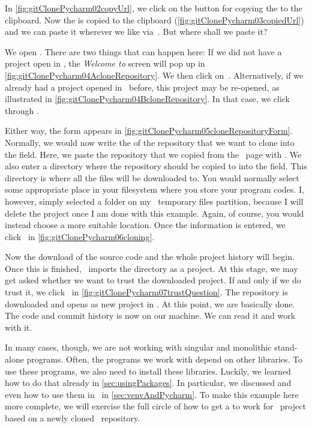 In \cref{fig:gitClonePycharm02copyUrl}, we click on the button for copying the  to the clipboard.
Now the  is copied to the clipboard (\cref{fig:gitClonePycharm03copiedUrl}) and we can paste it wherever we like via~.
But where shall we paste it?

We open \pycharm.
There are two things that can happen here:
If we did not have a project open in \pycharm, the \emph{Welcome to \pycharm} screen will pop up in \cref{fig:gitClonePycharm04AcloneRepository}.
We then click on~.
Alternatively, if we already had a project opened in \pycharm\ before, this project may be re-opened, as illustrated in \cref{fig:gitClonePycharm04BcloneRepository}.
In that case, we click through .

Either way, the  form appears in \cref{fig:gitClonePycharm05cloneRepositoryForm}.
Normally, we would now write the  of the repository that we want to clone into the  field.
Here, we paste the repository  that we copied from the \github\ page with .
We also enter a directory where the repository should be copied to into the  field.
This directory is where all the files will be downloaded to.
You would normally select some appropriate place in your filesystem where you store your program codes.
I, however, simply selected a folder on my \linux\ temporary files partition, because I will delete the project once I am done with this example.
Again, of course, you would instead choose a more suitable location.
Once the information is entered, we click~ in \cref{fig:gitClonePycharm06cloning}.

Now the download of the source code and the whole project history will begin.
Once this is finished, \pycharm\ imports the directory as a project.
At this stage, we may get asked whether we want to trust the downloaded project.
If and only if we do trust it, we click~ in \cref{fig:gitClonePycharm07trustQuestion}.
The repository is downloaded and opens as new project in \pycharm.
At this point, we are basically done.
The code and commit history is now on our machine.
We can read it and work with it.

In many cases, though, we are not working with singular and monolithic stand-alone programs.
Often, the programs we work with depend on other libraries.
To use these programs, we also need to install these libraries.
Luckily, we learned how to do that already in \cref{sec:usingPackages}.
In particular, we discussed  and even how to use them in \pycharm\ in \cref{sec:venvAndPycharm}.
To make this example here more complete, we will exercise the full circle of how to get a  to work for \pycharm\ project based on a newly cloned \github\ repository.

